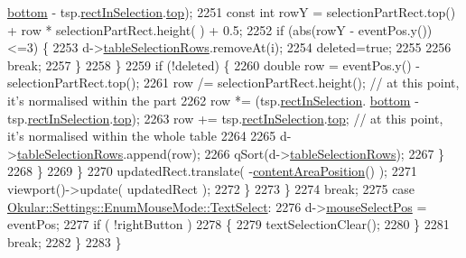 \begin{DoxyCode}
      \hyperlink{classOkular_1_1NormalizedRect_a06fddfff238371f6f584360c0678741a}{bottom} - tsp.\hyperlink{structTableSelectionPart_a237572cb28552e59818071208c21ee43}{rectInSelection}.\hyperlink{classOkular_1_1NormalizedRect_acfb70f6417c993508d50090b512cb954}{top});
2251                                 \textcolor{keyword}{const} \textcolor{keywordtype}{int} rowY =  selectionPartRect.top() + row * selectionPartRect.height(
      ) + 0.5;
2252                                 \textcolor{keywordflow}{if} (abs(rowY - eventPos.y())<=3) \{
2253                                     d->\hyperlink{classPageViewPrivate_afa6ab874498223c0f7788831a67ef007}{tableSelectionRows}.removeAt(i);
2254                                     deleted=\textcolor{keyword}{true};
2255 
2256                                     \textcolor{keywordflow}{break};
2257                                 \}
2258                             \}
2259                             \textcolor{keywordflow}{if} (!deleted) \{
2260                                 \textcolor{keywordtype}{double} row = eventPos.y() - selectionPartRect.top();
2261                                 row /= selectionPartRect.height(); \textcolor{comment}{// at this point, it's normalised within
       the part}
2262                                 row *= (tsp.\hyperlink{structTableSelectionPart_a237572cb28552e59818071208c21ee43}{rectInSelection}.
      \hyperlink{classOkular_1_1NormalizedRect_a06fddfff238371f6f584360c0678741a}{bottom} - tsp.\hyperlink{structTableSelectionPart_a237572cb28552e59818071208c21ee43}{rectInSelection}.\hyperlink{classOkular_1_1NormalizedRect_acfb70f6417c993508d50090b512cb954}{top});
2263                                 row += tsp.\hyperlink{structTableSelectionPart_a237572cb28552e59818071208c21ee43}{rectInSelection}.\hyperlink{classOkular_1_1NormalizedRect_acfb70f6417c993508d50090b512cb954}{top}; \textcolor{comment}{// at this point, it's
       normalised within the whole table}
2264 
2265                                 d->\hyperlink{classPageViewPrivate_afa6ab874498223c0f7788831a67ef007}{tableSelectionRows}.append(row);
2266                                 qSort(d->\hyperlink{classPageViewPrivate_afa6ab874498223c0f7788831a67ef007}{tableSelectionRows});
2267                             \}
2268                         \}
2269                     \}
2270                     updatedRect.translate( -\hyperlink{classPageView_a055aaf87367b9ad0dcfcdc3d2f5ff619}{contentAreaPosition}() );
2271                     viewport()->update( updatedRect );
2272                 \}
2273              \}
2274             \textcolor{keywordflow}{break};
2275         \textcolor{keywordflow}{case} \hyperlink{classOkular_1_1Settings_1_1EnumMouseMode_ab2ae04e2d7d069f02195ccf32c52415bafafb47a3dab02c4016246ee80090e2d9}{Okular::Settings::EnumMouseMode::TextSelect}:
2276             d->\hyperlink{classPageViewPrivate_aaf8d4b01e8bb0db7ff49544972422a63}{mouseSelectPos} = eventPos;
2277             \textcolor{keywordflow}{if} ( !rightButton )
2278             \{
2279                 textSelectionClear();
2280             \}
2281             \textcolor{keywordflow}{break};
2282     \}
2283 \}
\end{DoxyCode}
